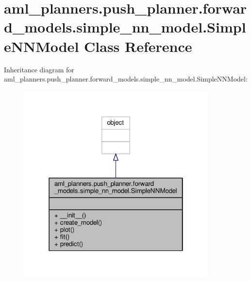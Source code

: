 \hypertarget{classaml__planners_1_1push__planner_1_1forward__models_1_1simple__nn__model_1_1_simple_n_n_model}{\section{aml\-\_\-planners.\-push\-\_\-planner.\-forward\-\_\-models.\-simple\-\_\-nn\-\_\-model.\-Simple\-N\-N\-Model Class Reference}
\label{classaml__planners_1_1push__planner_1_1forward__models_1_1simple__nn__model_1_1_simple_n_n_model}
}


Inheritance diagram for aml\-\_\-planners.\-push\-\_\-planner.\-forward\-\_\-models.\-simple\-\_\-nn\-\_\-model.\-Simple\-N\-N\-Model\-:
\nopagebreak
\begin{figure}[H]
\begin{center}
\leavevmode
\includegraphics[width=286pt]{classaml__planners_1_1push__planner_1_1forward__models_1_1simple__nn__model_1_1_simple_n_n_model__inherit__graph}
\end{center}
\end{figure}


